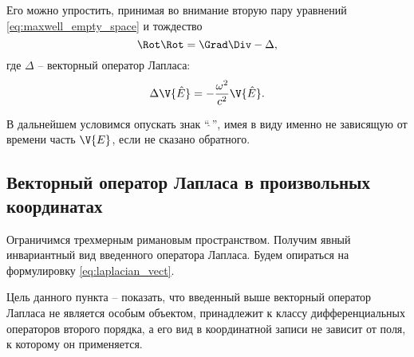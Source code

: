     Его можно упростить, принимая во внимание вторую пару уравнений \autoref{eq:maxwell_empty_space} и тождество
    \begin{equation}\label{eq:laplacian_vect}
        \Rot\Rot = \Grad\Div - \Delta,
    \end{equation}
    где $\Delta$ -- векторный оператор Лапласа:
    \begin{equation}
        \Delta\V{\hat{E}} = - \frac{\omega^2}{c^2} \V{\hat{E}}.
    \end{equation}

    В дальнейшем условимся опускать знак \enquote{$\hat{\ }$}, имея в виду именно не зависящую от времени часть $\V{E}$, если не сказано обратного.

%
%
%
%
%
%

\subsection{Векторный оператор Лапласа в произвольных координатах}

    Ограничимся трехмерным римановым пространством. Получим явный инвариантный вид введенного оператора Лапласа. Будем опираться на формулировку \autoref{eq:laplacian_vect}.

    Цель данного пункта -- показать, что введенный выше векторный оператор Лапласа не является особым объектом, принадлежит к классу дифференциальных операторов второго порядка, а его вид в координатной записи не зависит от поля, к которому он применяется.

